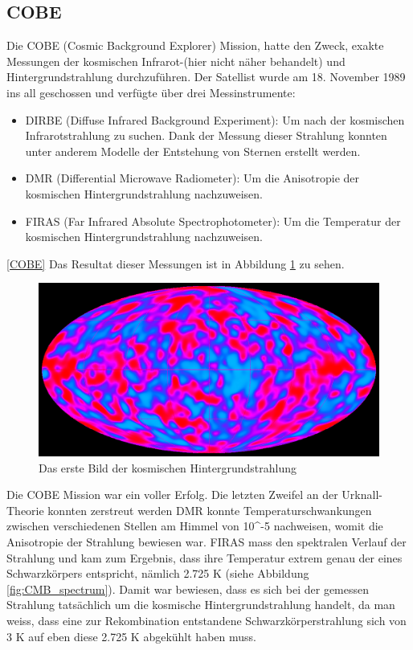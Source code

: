 	\subsection{COBE}
	Die COBE (Cosmic Background Explorer) Mission, hatte den Zweck, exakte Messungen der kosmischen Infrarot-(hier nicht näher behandelt) und Hintergrundstrahlung durchzuführen.
	Der Satellist wurde am 18. November 1989 ins all geschossen und verfügte über drei Messinstrumente:
	\begin{itemize}
		\item DIRBE (Diffuse Infrared Background Experiment): Um nach der kosmischen Infrarotstrahlung zu suchen.
		Dank der Messung dieser Strahlung konnten unter anderem Modelle der Entstehung von Sternen erstellt werden.
		\item DMR (Differential Microwave Radiometer): Um die Anisotropie der kosmischen Hintergrundstrahlung nachzuweisen.
		\item FIRAS (Far Infrared Absolute Spectrophotometer): Um die Temperatur der kosmischen Hintergrundstrahlung nachzuweisen. 
	\end{itemize}
	\ref{COBE}
	Das Resultat dieser Messungen ist in Abbildung \ref{fig:COBE} zu sehen.
	\begin{figure}
		\includegraphics[scale=1]{cmb/images/COBE_CMB.jpg}
		\caption{Das erste Bild der kosmischen Hintergrundstrahlung}
		\label{fig:COBE}
	\end{figure}
	Die COBE Mission war ein voller Erfolg.
	Die letzten Zweifel an der Urknall-Theorie konnten zerstreut werden
	DMR konnte Temperaturschwankungen zwischen verschiedenen Stellen am Himmel von 10^-5 nachweisen, womit die Anisotropie der Strahlung bewiesen war.
	FIRAS mass den spektralen Verlauf der Strahlung und kam zum Ergebnis, dass ihre Temperatur extrem genau der eines Schwarzkörpers entspricht, nämlich 2.725 K (siehe Abbildung \ref{fig:CMB_spectrum}).
	Damit war bewiesen, dass es sich bei der gemessen Strahlung tatsächlich um die kosmische Hintergrundstrahlung handelt, da man weiss, dass eine zur Rekombination entstandene Schwarzkörperstrahlung sich von 3 K auf eben diese 2.725 K abgekühlt haben muss.
	
